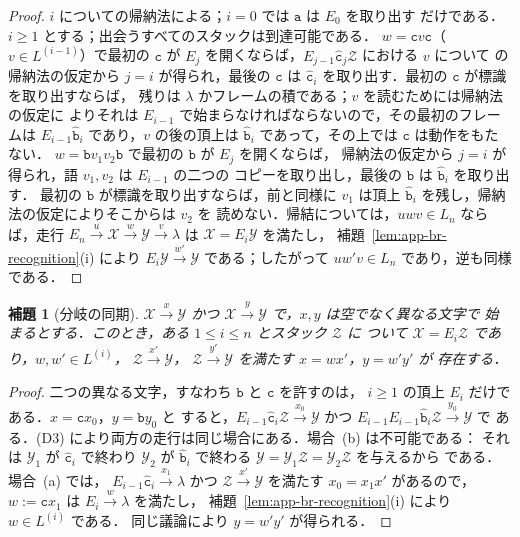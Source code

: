 \documentclass[11pt,a4paper]{ltjsarticle}
\numberwithin{equation}{section}
\theoremstyle{plain}
\newtheorem{lemma}[theorem]{補題}
\theoremstyle{definition}
\theoremstyle{remark}
\theoremstyle{plain}
\newcommand{\eps}{\lambda}
\begin{document}
\begin{proof}
$i$ についての帰納法による；$i=0$ では $\mathtt a$ は $E_0$ を取り出す
だけである．$i\ge1$ とする；出会うすべてのスタックは到達可能である．
$w=\mathtt cv\mathtt c$（$v\in L^{(i-1)}$）で最初の $\mathtt c$ が $E_j$
を開くならば，$E_{j-1}\hat{\mathtt c}_j\mathcal Z$ における $v$ について
の帰納法の仮定から $j=i$ が得られ，最後の $\mathtt c$ は
$\hat{\mathtt c}_i$ を取り出す．最初の $\mathtt c$ が標識を取り出すならば，
残りは $\eps$ かフレームの積である；$v$ を読むためには帰納法の仮定に
よりそれは $E_{i-1}$ で始まらなければならないので，その最初のフレームは
$E_{i-1}\hat{\mathtt b}_i$ であり，$v$ の後の頂上は $\hat{\mathtt b}_i$
であって，その上では $\mathtt c$ は動作をもたない．
$w=\mathtt bv_1v_2\mathtt b$ で最初の $\mathtt b$ が $E_j$ を開くならば，
帰納法の仮定から $j=i$ が得られ，語 $v_1,v_2$ は $E_{i-1}$ の二つの
コピーを取り出し，最後の $\mathtt b$ は $\hat{\mathtt b}_i$ を取り出す．
最初の $\mathtt b$ が標識を取り出すならば，前と同様に $v_1$ は頂上
$\hat{\mathtt b}_i$ を残し，帰納法の仮定によりそこからは $v_2$ を
読めない．帰結については，$uwv\in L_n$ ならば，走行
$E_n\xrightarrow{u}\mathcal X\xrightarrow{w}\mathcal Y\xrightarrow{v}\eps$
は $\mathcal X=E_i\mathcal Y$ を満たし，
補題~\ref{lem:app-br-recognition}(i) により
$E_i\mathcal Y\xrightarrow{w'}\mathcal Y$ である；したがって
$uw'v\in L_n$ であり，逆も同様である．
\end{proof}

\begin{lemma}[分岐の同期]\label{lem:app-br-branch}
$\mathcal X\xrightarrow{x}\mathcal Y$ かつ
$\mathcal X\xrightarrow{y}\mathcal Y$ で，$x,y$ は空でなく異なる文字で
始まるとする．このとき，ある $1\le i\le n$ とスタック $\mathcal Z$ に
ついて $\mathcal X=E_i\mathcal Z$ であり，$w,w'\in L^{(i)}$，
$\mathcal Z\xrightarrow{x'}\mathcal Y$，
$\mathcal Z\xrightarrow{y'}\mathcal Y$ を満たす $x=wx'$，$y=w'y'$ が
存在する．
\end{lemma}

\begin{proof}
二つの異なる文字，すなわち $\mathtt b$ と $\mathtt c$ を許すのは，
$i\ge1$ の頂上 $E_i$ だけである．$x=\mathtt cx_0$，$y=\mathtt by_0$ と
すると，$E_{i-1}\hat{\mathtt c}_i\mathcal Z\xrightarrow{x_0}\mathcal Y$ かつ
$E_{i-1}E_{i-1}\hat{\mathtt b}_i\mathcal Z\xrightarrow{y_0}\mathcal Y$ で
ある．(D3) により両方の走行は同じ場合にある．場合~(b) は不可能である：
それは $\mathcal Y_1$ が $\hat{\mathtt c}_i$ で終わり $\mathcal Y_2$ が
$\hat{\mathtt b}_i$ で終わる
$\mathcal Y=\mathcal Y_1\mathcal Z=\mathcal Y_2\mathcal Z$ を与えるから
である．場合~(a) では，
$E_{i-1}\hat{\mathtt c}_i\xrightarrow{x_1}\eps$ かつ
$\mathcal Z\xrightarrow{x'}\mathcal Y$ を満たす $x_0=x_1x'$ があるので，
$w:=\mathtt cx_1$ は $E_i\xrightarrow{w}\eps$ を満たし，
補題~\ref{lem:app-br-recognition}(i) により $w\in L^{(i)}$ である．
同じ議論により $y=w'y'$ が得られる．
\end{proof}
\end{document}
